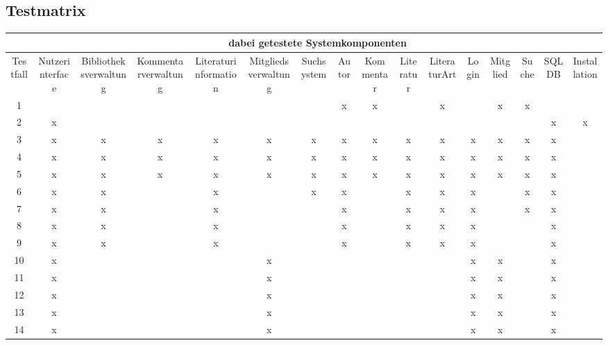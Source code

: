 \subsection{Testmatrix}
\begin{longtable}{|c|c|c|c|c|c|c|c|c|c|c|c|c|c|c|c|}
\hline
 & \multicolumn{15}{c|}{dabei getestete Systemkomponenten} \\\hline
	Testfall & 
	\multicolumn{1}{R{6em}|}{Nutzerinterface} &
	\multicolumn{1}{R{6em}|}{Bibliotheksverwaltung} &
	\multicolumn{1}{R{6em}|}{Kommentarverwaltung} &
	\multicolumn{1}{R{6em}|}{Literaturinformation} &
	\multicolumn{1}{R{6em}|}{Mitgliedsverwaltung} &
	\multicolumn{1}{R{6em}|}{Suchsystem} &
	\multicolumn{1}{R{6em}|}{Autor} &
	\multicolumn{1}{R{6em}|}{Kommentar} &
	\multicolumn{1}{R{6em}|}{Literatur} &
	\multicolumn{1}{R{6em}|}{LiteraturArt} &
	\multicolumn{1}{R{6em}|}{Login} &
	\multicolumn{1}{R{6em}|}{Mitglied} &
	\multicolumn{1}{R{6em}|}{Suche} &
	\multicolumn{1}{R{6em}|}{SQLDB} &
	\multicolumn{1}{R{6em}|}{Installation}\\
\hline\hline
\endhead
 1 &   &   &   &   &   &   & x & x &   & x &   & x & x &   &  \\\hline
 2 & x &   &   &   &   &   &   &   &   &   &   &   &   & x & x\\\hline
 3 & x & x & x & x & x & x & x & x & x & x & x & x & x & x &  \\\hline
 4 & x & x & x & x & x & x & x & x & x & x & x & x & x & x &  \\\hline
 5 & x & x & x & x & x & x & x & x & x & x & x & x & x & x &  \\\hline
 6 & x & x &   & x &   & x & x &   & x & x & x &   & x & x &  \\\hline
 7 & x & x &   & x &   &   & x &   & x & x & x &   & x & x &  \\\hline
 8 & x & x &   & x &   &   & x &   & x & x & x &   &   & x &  \\\hline
 9 & x & x &   & x &   &   & x &   & x & x & x &   &   & x &  \\\hline
10 & x &   &   &   & x &   &   &   &   &   & x & x &   & x &  \\\hline
11 & x &   &   &   & x &   &   &   &   &   & x & x &   & x &  \\\hline
12 & x &   &   &   & x &   &   &   &   &   & x & x &   & x &  \\\hline
13 & x &   &   &   & x &   &   &   &   &   & x & x &   & x &  \\\hline
14 & x &   &   &   & x &   &   &   &   &   & x & x &   & x &  \\\hline

\end{longtable}
